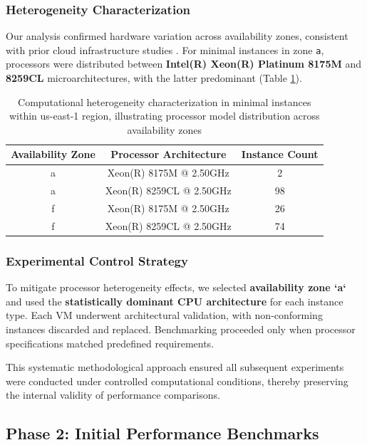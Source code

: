 \documentclass[conference]{IEEEtran}
\begin{document}
	\subsubsection{Heterogeneity Characterization}
	\label{met:heterogeneity-detection-item}
	Our analysis confirmed hardware variation across availability zones, consistent with prior cloud infrastructure studies \cite{b2, b5, b6, b7}. For minimal instances in zone \texttt{a}, processors were distributed between \textbf{Intel(R) Xeon(R) Platinum 8175M} and \textbf{8259CL} microarchitectures, with the latter predominant (Table \ref{tab:processors}).
	
	\begin{table}[htbp]
		\centering
		\caption{Computational heterogeneity characterization in minimal instances within us-east-1 region, illustrating processor model distribution across availability zones}
		\label{tab:processors}
		\begin{tabular}{|c|c|c|}
			\hline
			Availability Zone & Processor Architecture & Instance Count \\ \hline
			a & Xeon(R) 8175M @ 2.50GHz & 2 \\ \hline
			a & Xeon(R) 8259CL @ 2.50GHz & 98 \\ \hline
			f & Xeon(R) 8175M @ 2.50GHz & 26 \\ \hline
			f & Xeon(R) 8259CL @ 2.50GHz & 74 \\ \hline
		\end{tabular}
	\end{table}
	
	\subsubsection{Experimental Control Strategy}
	To mitigate processor heterogeneity effects, we selected \textbf{availability zone `a`} and used the \textbf{statistically dominant CPU architecture} for each instance type. Each VM underwent architectural validation, with non-conforming instances discarded and replaced. Benchmarking proceeded only when processor specifications matched predefined requirements.
	
	This systematic methodological approach ensured all subsequent experiments were conducted under controlled computational conditions, thereby preserving the internal validity of performance comparisons.
	
	\subsection{Phase 2: Initial Performance Benchmarks}
	\label{execution-initial-performance-benchmarks}
	
\end{document}
